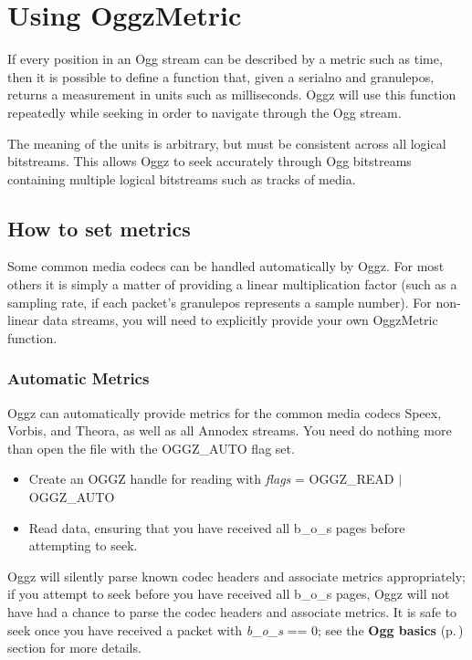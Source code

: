\section{Using Oggz\-Metric}
\label{group__metric}
If every position in an Ogg stream can be described by a metric such as time, then it is possible to define a function that, given a serialno and granulepos, returns a measurement in units such as milliseconds. Oggz will use this function repeatedly while seeking in order to navigate through the Ogg stream.

The meaning of the units is arbitrary, but must be consistent across all logical bitstreams. This allows Oggz to seek accurately through Ogg bitstreams containing multiple logical bitstreams such as tracks of media.\subsection{How to set metrics}\label{setting}
Some common media codecs can be handled automatically by Oggz. For most others it is simply a matter of providing a linear multiplication factor (such as a sampling rate, if each packet's granulepos represents a sample number). For non-linear data streams, you will need to explicitly provide your own Oggz\-Metric function.\subsubsection{Automatic Metrics}\label{auto}
Oggz can automatically provide metrics for the common media codecs Speex, Vorbis, and Theora, as well as all Annodex streams. You need do nothing more than open the file with the OGGZ\_\-AUTO flag set.

\begin{itemize}
\item Create an OGGZ handle for reading with {\em flags\/} = OGGZ\_\-READ $|$ OGGZ\_\-AUTO\item Read data, ensuring that you have received all b\_\-o\_\-s pages before attempting to seek.\end{itemize}


Oggz will silently parse known codec headers and associate metrics appropriately; if you attempt to seek before you have received all b\_\-o\_\-s pages, Oggz will not have had a chance to parse the codec headers and associate metrics. It is safe to seek once you have received a packet with {\em b\_\-o\_\-s\/} == 0; see the {\bf Ogg basics }{\rm (p.\,\pageref{group__basics})} section for more details.

